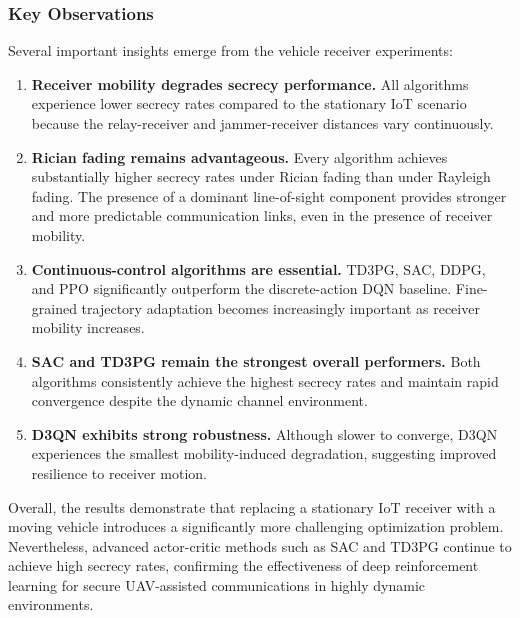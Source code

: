 \documentclass[journal,onecolumn]{IEEEtran}
\begin{document}
\subsubsection{Key Observations}

Several important insights emerge from the vehicle receiver experiments:

\begin{enumerate}
    \item \textbf{Receiver mobility degrades secrecy performance.} All algorithms experience lower secrecy rates compared to the stationary IoT scenario because the relay-receiver and jammer-receiver distances vary continuously.

    \item \textbf{Rician fading remains advantageous.} Every algorithm achieves substantially higher secrecy rates under Rician fading than under Rayleigh fading. The presence of a dominant line-of-sight component provides stronger and more predictable communication links, even in the presence of receiver mobility.

    \item \textbf{Continuous-control algorithms are essential.} TD3PG, SAC, DDPG, and PPO significantly outperform the discrete-action DQN baseline. Fine-grained trajectory adaptation becomes increasingly important as receiver mobility increases.

    \item \textbf{SAC and TD3PG remain the strongest overall performers.} Both algorithms consistently achieve the highest secrecy rates and maintain rapid convergence despite the dynamic channel environment.

    \item \textbf{D3QN exhibits strong robustness.} Although slower to converge, D3QN experiences the smallest mobility-induced degradation, suggesting improved resilience to receiver motion.
\end{enumerate}

Overall, the results demonstrate that replacing a stationary IoT receiver with a moving vehicle introduces a significantly more challenging optimization problem. Nevertheless, advanced actor-critic methods such as SAC and TD3PG continue to achieve high secrecy rates, confirming the effectiveness of deep reinforcement learning for secure UAV-assisted communications in highly dynamic environments.
\end{document}
